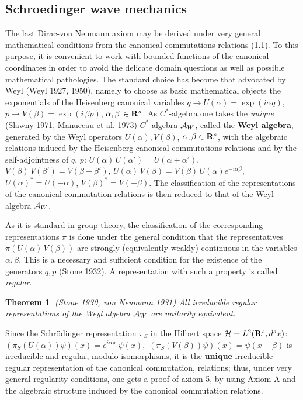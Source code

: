 \documentclass[12pt]{article}
\newtheorem{Theorem}{Theorem}[section]
\def \ra {\rightarrow}
\def \a {{\alpha}}
\def \b {{\beta}}
\def \A {{\cal A}}
\def \H {\mbox{${\cal H}$}}
\def \Rbf {{\bf R}}
\begin{document}

\subsection{Schroedinger wave mechanics}

\vspace{1mm} \noindent The last Dirac-von Neumann axiom may be derived under very general mathematical conditions from the canonical commutations relations (1.1). 
To this purpose, it is convenient to work with bounded functions of the canonical coordinates in order to avoid the delicate domain questions as well as possible mathematical pathologies.
The standard choice has become that advocated by Weyl (Weyl 1927, 1950), namely to choose as basic mathematical objects the exponentials of the Heisenberg canonical variables $ q \ra  U(\a) = \exp{( i 
\a q)}$,  $p \ra V(\b) = \exp{( i \,\b p)}$, $\a, \b \,\in 
\Rbf^s $. 
As $C^*$-algebra one takes the {\em unique} (Slawny 1971, Manuceau et al. 1973) $C^*$-algebra $\A_W$, called the {\bf Weyl algebra}, generated by the Weyl operators $U(\a), V(\b)$, $\a, \b \in \Rbf^s$, with the algebraic relations induced by the Heisenberg canonical commutations relations   and by the self-adjointness of $q, 
\, p$: $ U(\a)\,U(\a') = U(\a + \a')$, $V(\b)\,V(\b') = V(\b + \b')$, $U(\a)\, V(\b) = V(\b) \,U(\a) e^{- i \a \b}$, $U(\a)^* = U(-\a)$, $V(\b)^* = V(-\b)$.
The classification of the representations of the canonical commutation relations is then reduced to that of the Weyl algebra $\A_W$. 


As it is standard in group theory, the classification of the corresponding representations $\pi$ is done under the  general condition that the representatives $\pi(U(\a)\,V(\b))$ are strongly (equivalently weakly) continuous in the variables $\a, \b$. This is a necessary and sufficient condition for the existence of the generators $q, p$ (Stone 1932). A representation with such a property is called {\em regular}.
  
\begin{Theorem} (Stone 1930, von Neumann 1931) All irreducible regular representations of the Weyl algebra $\A_W$ are unitarily equivalent.
\end{Theorem}
Since the Schr\"{o}dinger representation $\pi_S$ in the Hilbert space $\H = L^2(\Rbf^s, d^s x)$: $(\pi_S(U(\a))\psi)(x) = e^{i \a\,x}\,\psi(x), \,\,(\pi_S(V(\b))\psi)(x) = \psi(x + \b)$ is irreducible and regular, modulo isomorphisms, it is the {\bf unique} irreducible regular representation of the canonical commutation,  relations; thus,  under very general regularity conditions, one  gets a proof of axiom 5,  by  using Axiom A and the algebraic structure induced by the canonical commutation relations.
\end{document}
